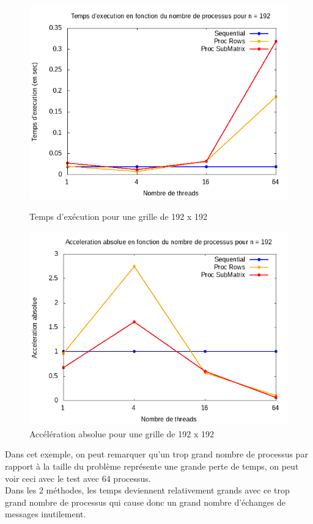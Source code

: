 \documentclass[10pt,a4paper]{article}
\begin{document}
\begin{figure}[h]
  \centering
  \begin{minipage}[b]{0.49\textwidth}
	\includegraphics[width=\textwidth]{./Time/size_192_time.png}
    \caption{Temps d'exécution pour une grille de 192 x 192}
  \end{minipage}
  \hfill
  \begin{minipage}[b]{0.49\textwidth}
    \includegraphics[width=\textwidth]{./Time/size_192_acceleration.png}
    \caption{Accélération absolue pour une grille de 192 x 192}
  \end{minipage}
\end{figure}
Dans cet exemple, on peut remarquer qu'un trop grand nombre de processus par rapport à la taille du problème représente une grande perte de temps, on peut voir ceci avec le test avec 64 processus. \\
Dans les 2 méthodes, les temps deviennent relativement grands avec ce trop grand nombre de processus qui cause donc un grand nombre d'échanges de messages inutilement.\\
\end{document}
